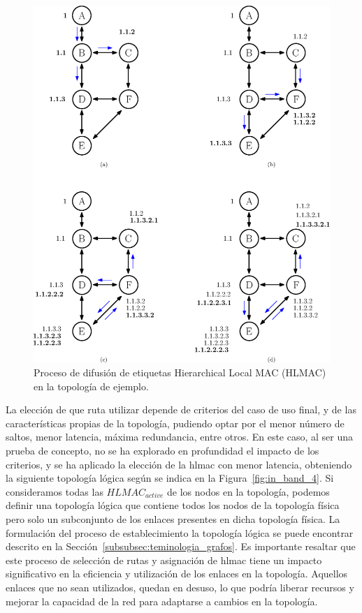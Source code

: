 \begin{figure}[ht!]
     \centering
     \includegraphics[width=\textwidth]{fig/04_in-band/in_band_3.eps}
     \caption{Proceso de difusión de etiquetas Hierarchical Local MAC (HLMAC) en la topología de ejemplo.}
     \label{fig:in_band_3}
\end{figure}

La elección de que ruta utilizar depende de criterios del caso de uso final, y de las características propias de la topología, pudiendo optar por el menor número de saltos, menor latencia, máxima redundancia, entre otros. En este caso, al ser una prueba de concepto, no se ha explorado en profundidad el impacto de los criterios, y se ha aplicado la elección de la \gls{hlmac} con menor latencia, obteniendo la siguiente topología lógica según se indica en la Figura~\ref{fig:in_band_4}. Si consideramos todas las $HLMAC_{active}$ de los nodos en la topología, podemos definir una topología lógica que contiene todos los nodos de la topología física pero solo un subconjunto de los enlaces presentes en dicha topología física. La formulación del proceso de establecimiento la topología lógica se puede encontrar descrito en la Sección~\ref{subsubsec:teminologia_grafos}. Es importante resaltar que este proceso de selección de rutas y asignación de \gls{hlmac} tiene un impacto significativo en la eficiencia y utilización de los enlaces en la topología. Aquellos enlaces que no sean utilizados, quedan en desuso, lo que podría liberar recursos y mejorar la capacidad de la red para adaptarse a cambios en la topología.



